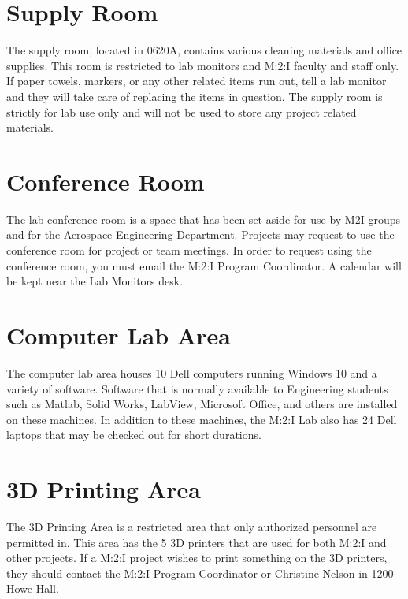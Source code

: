 \section{Supply Room}
The supply room, located in 0620A, contains various cleaning materials and office supplies. This room is restricted to lab monitors and M:2:I faculty and staff only. If paper towels, markers, or any other related items run out, tell a lab monitor and they will take care of replacing the items in question. The supply room is strictly for lab use only and will not be used to store any project related materials.

\section{Conference Room}
The lab conference room is a space that has been set aside for use by M2I groups and for the Aerospace Engineering Department. Projects may request to use the conference room for project or team meetings.  In order to request using the conference room, you must email the M:2:I Program Coordinator.  A calendar will be kept near the Lab Monitors desk.

\section{Computer Lab Area}
The computer lab area houses 10 Dell computers running Windows 10 and a variety of software.  Software that is normally available to Engineering students such as Matlab, Solid Works, LabView, Microsoft Office, and others are installed on these machines.  In addition to these machines, the M:2:I Lab also has 24 Dell laptops that may be checked out for short durations.  

\section{3D Printing Area}
The 3D Printing Area is a restricted area that only authorized personnel are permitted in.  This area has the 5 3D printers that are used for both M:2:I and other projects.  If a M:2:I project wishes to print something on the 3D printers, they should contact the M:2:I Program Coordinator or Christine Nelson in 1200 Howe Hall.

